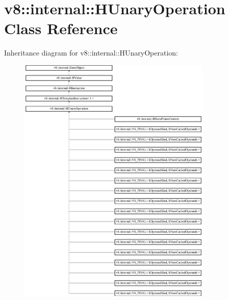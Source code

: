\hypertarget{classv8_1_1internal_1_1_h_unary_operation}{}\section{v8\+:\+:internal\+:\+:H\+Unary\+Operation Class Reference}
\label{classv8_1_1internal_1_1_h_unary_operation}
Inheritance diagram for v8\+:\+:internal\+:\+:H\+Unary\+Operation\+:\begin{figure}[H]
\begin{center}
\leavevmode
\includegraphics[height=12.000000cm]{classv8_1_1internal_1_1_h_unary_operation}
\end{center}
\end{figure}
